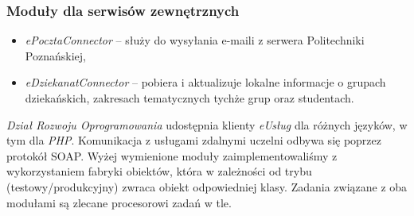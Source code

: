 \subsubsection{Moduły dla serwisów zewnętrznych}
\begin{itemize}
\item \emph{ePocztaConnector} -- służy do wysyłania e-maili z serwera Politechniki Poznańskiej,
\item \emph{eDziekanatConnector} -- pobiera i aktualizuje lokalne informacje o grupach dziekańskich, zakresach tematycznych tychże grup oraz studentach.
\end{itemize}

\emph{Dział Rozwoju Oprogramowania} udostępnia klienty \emph{eUsług} dla różnych języków, w tym dla \emph{PHP}. Komunikacja z usługami zdalnymi uczelni odbywa się poprzez protokół SOAP. Wyżej wymienione moduły zaimplementowaliśmy z wykorzystaniem fabryki obiektów, która w zależności od trybu (testowy/produkcyjny) zwraca obiekt odpowiedniej klasy. Zadania związane z oba modułami są zlecane procesorowi zadań w tle.
